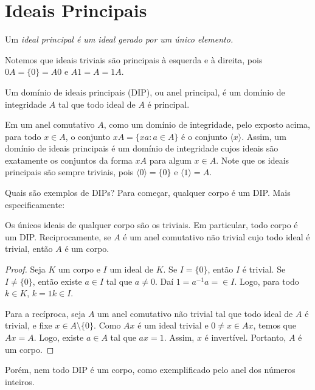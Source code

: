 \section{Ideais Principais}
\begin{definition}
    Um \em{ideal principal} é um ideal gerado por um único elemento.
\end{definition}

Notemos que ideais triviais são principais à esquerda e à direita, pois $0A=\{0\}=A0$ e $A1=A=1A$.

\begin{definition}
    Um domínio de ideais principais (DIP), ou anel principal, é um domínio de integridade $A$ tal que todo ideal de $A$ é principal.
\end{definition}

Em um anel comutativo $A$, como um domínio de integridade, pelo exposto acima, para todo $x \in A$, o conjunto $xA=\{xa: a \in A\}$ é o conjunto $\langle x\rangle$.
Assim, um domínio de ideais principais é um domínio de integridade cujos ideais são exatamente os conjuntos da forma $xA$ para algum $x \in A$. Note que os ideais principais são sempre triviais, pois $\langle 0\rangle=\{0\}$ e $\langle 1\rangle = A$.

Quais são exemplos de DIPs? Para começar, qualquer corpo é um DIP. Mais especificamente:

\begin{prop}
    Os únicos ideais de qualquer corpo são os triviais.
    Em particular, todo corpo é um DIP.
    Reciprocamente, se $A$ é um anel comutativo não trivial cujo todo ideal é trivial, então $A$ é um corpo.
\end{prop}
\begin{proof}
    Seja $K$ um corpo e $I$ um ideal de $K$.
    Se $I=\{0\}$, então $I$ é trivial.
    Se $I\neq \{0\}$, então existe $a \in I$ tal que $a \neq 0$. Daí $1=a^{-1}a=\in I$.
    Logo, para todo $k \in K$, $k=1k\in I$.

    Para a recíproca, seja $A$ um anel comutativo não trivial tal que todo ideal de $A$ é trivial, e fixe $x \in A\setminus \{0\}$.
    Como $Ax$ é um ideal trivial e $0\neq x \in Ax$, temos que $Ax=A$.
    Logo, existe $a \in A$ tal que $ax=1$. Assim, $x$ é invertível.
    Portanto, $A$ é um corpo.
\end{proof}

Porém, nem todo DIP é um corpo, como exemplificado pelo anel dos números inteiros.


